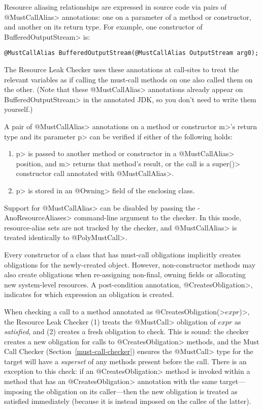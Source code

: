 Resource aliasing relationships are expressed in source code via pairs of \<@MustCallAlias> annotations:
one on a parameter of a method or constructor, and another on its return type.
For example, one constructor of \<BufferedOutputStream> is:
\begin{verbatim}
@MustCallAlias BufferedOutputStream(@MustCallAlias OutputStream arg0);
\end{verbatim}
The Resource Leak Checker uses these annotations at call-sites to treat the relevant variables as if
calling the must-call methods on one also called them on the other.
(Note that these \<@MustCallAlias> annotations already appear on
\<BufferedOutputStream> in the annotated JDK, so you don't need to write
them yourself.)

A pair of \<@MustCallAlias> annotations on a method or constructor \<m>'s return type
and its parameter \<p> can be verified if either of the following holds:
\begin{enumerate}
\item \<p> is passed to another method or constructor in a
  \<@MustCallAlias> position, and \<m> returns that method's result,
  or the call is a \<super()> constructor call annotated
  with \<@MustCallAlias>.
\item \<p> is stored in an \<@Owning> field of the enclosing class.
\end{enumerate}

Support for \<@MustCallAlias> can be disabled by passing the \<-AnoResourceAliases> command-line
argument to the checker. In this mode, resource-alias sets are not tracked by the checker,
and \<@MustCallAlias> is treated identically to \<@PolyMustCall>.


Every constructor of a class that has must-call obligations
implicitly creates obligations for the newly-created object.
However, non-constructor methods may also create obligations
when re-assigning non-final, owning fields or allocating
new system-level resources.
A post-condition annotation,
\<@CreatesObligation>,
indicates for which expression an obligation is created.

When checking a call to a method annotated as
\<@CreatesObligation(>$expr$\<)>, the Resource Leak Checker
(1) treats the \<@MustCall>
obligation of $expr$ as \emph{satisfied},
and (2) creates a fresh obligation to check.
This is sound: the checker creates a new obligation for calls to
\<@CreatesObligation> methods, and the Must Call Checker (Section~\ref{must-call-checker}) ensures the
\<@MustCall> type for the target will have a \emph{superset} of any methods present
before the call.
There is an exception to this check: if an \<@CreatesObligation>
method is invoked within a method that has an \<@CreatesObligation> annotation
with the same target---imposing the obligation on its caller---then
the new obligation is treated as satisfied immediately (because it is instead imposed
on the callee of the latter).

